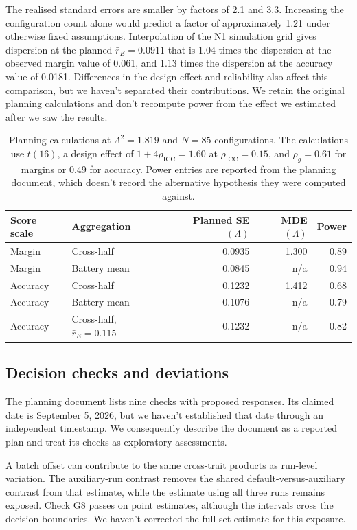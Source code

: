 The realised standard errors are smaller by factors of 2.1 and 3.3. Increasing the configuration count alone would predict a factor of approximately 1.21 under otherwise fixed assumptions. Interpolation of the N1 simulation grid gives dispersion at the planned $\bar r_E=0.0911$ that is 1.04 times the dispersion at the observed margin value of 0.061, and 1.13 times the dispersion at the accuracy value of 0.0181. Differences in the design effect and reliability also affect this comparison, but we haven't separated their contributions. We retain the original planning calculations and don't recompute power from the effect we estimated after we saw the results.

\begin{table}[!htb]
\centering
\caption{Planning calculations at $\Lambda^2=1.819$ and $N=85$ configurations. The calculations use $t(16)$, a design effect of $1+4\rho_{\mathrm{ICC}}=1.60$ at $\rho_{\mathrm{ICC}}=0.15$, and $\rho_g=0.61$ for margins or $0.49$ for accuracy. Power entries are reported from the planning document, which doesn't record the alternative hypothesis they were computed against.}
\label{tab:original4}
\small\setlength{\tabcolsep}{4pt}\renewcommand{\arraystretch}{1.12}
\begin{tabular}{llrrr}\toprule
Score scale & Aggregation & Planned SE$(\Lambda)$ & MDE$(\Lambda)$ & Power\\\midrule
Margin & Cross-half & 0.0935 & 1.300 & 0.89\\
Margin & Battery mean & 0.0845 & n/a & 0.94\\
Accuracy & Cross-half & 0.1232 & 1.412 & 0.68\\
Accuracy & Battery mean & 0.1076 & n/a & 0.79\\
Accuracy & Cross-half, $\bar r_E=0.115$ & 0.1232 & n/a & 0.82\\\bottomrule
\end{tabular}
\end{table}


\subsection{Decision checks and deviations}
The planning document lists nine checks with proposed responses. Its claimed date is September 5, 2026, but we haven't established that date through an independent timestamp. We consequently describe the document as a reported plan and treat its checks as exploratory assessments.

A batch offset can contribute to the same cross-trait products as run-level variation. The auxiliary-run contrast removes the shared default-versus-auxiliary contrast from that estimate, while the estimate using all three runs remains exposed. Check G8 passes on point estimates, although the intervals cross the decision boundaries. We haven't corrected the full-set estimate for this exposure.

